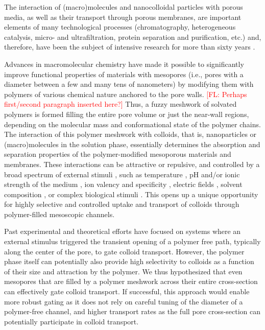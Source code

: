 \documentclass[12pt, a4paper]{article}
\newcommand\todo[1]{\textcolor{red}{#1}}
\begin{document}
The interaction of (macro)molecules and nanocolloidal particles with porous media, as well as their transport through porous membranes, are important elements of many technological processes (chromatography, heterogeneous catalysis, micro- and ultrafiltration, protein separation and purification, etc.) and, therefore, have been the subject of intensive research for more than sixty years \cite{Watson1959, Rout2003, Huang2023, Uredat2024}.

Advances in macromolecular chemistry have made it possible to significantly improve functional properties of materials with mesopores (i.e., pores with a diameter between a few and many tens of nanometers) by modifying them with polymers of various chemical nature anchored to  the pore walls.
\todo{[FL: Perhaps first/second paragraph inserted here?]}
Thus, a fuzzy meshwork of solvated polymers is formed filling the entire pore volume or just the near-wall regions, depending on the molecular mass and conformational state of the polymer chains.
The interaction of this polymer meshwork with colloids, that is, nanoparticles or (macro)molecules in the solution phase, essentially determines the absorption and separation properties of the polymer-modified mesoporous materials and membranes.
These interactions can be attractive or repulsive, and controlled by a broad spectrum of external stimuli \cite{Jeong2002, Lee2010, Low2019}, 
such as temperature                     \cite{Stetsyshyn2020}, 
pH and/or ionic strength of the medium  \cite{Dai2008, Zhang2005}, 
ion valency and specificity             \cite{Zhulina1999, Robertson2021},
electric fields                         \cite{Lokuge2005}, 
solvent composition                     \cite{Halperin2011, Darabi2016}, 
or complex biological stimuli           \cite{Ikeda2010, Lu2003}.
This opens up a unique opportunity for highly selective and controlled uptake and transport of colloids through polymer-filled mesoscopic channels.

Past experimental and theoretical efforts have focused on systems where an external stimulus triggered the transient opening of a polymer free path, typically along the center of the pore, to gate colloid transport.
However, the polymer phase itself can potentially also provide high selectivity to colloids as a function of their size and attraction by the polymer.
We thus hypothesized that even mesopores that are filled by a polymer meshwork across their entire cross-section can effectively gate colloid transport.
If successful, this approach would enable more robust gating as it does not rely on careful tuning of the diameter of a polymer-free channel, and higher transport rates as the full pore cross-section can potentially participate in colloid transport.
\end{document}
